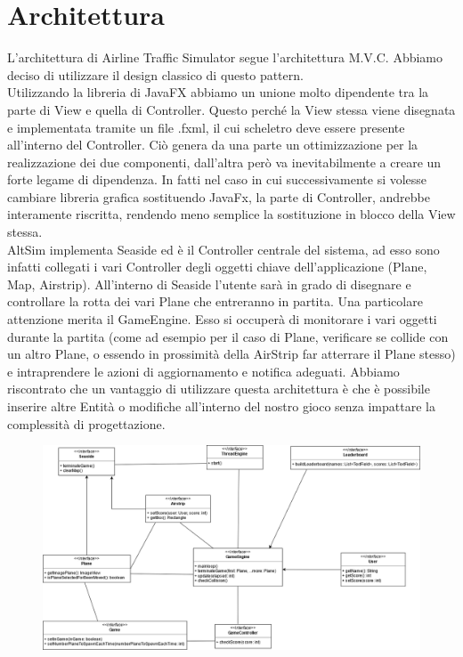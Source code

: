 \documentclass[a4paper,12pt]{report}
\begin{document}
\section{Architettura}
L’architettura di Airline Traffic Simulator segue l’architettura M.V.C. \newline
Abbiamo deciso di utilizzare il design classico di questo pattern.
\\
Utilizzando la libreria di JavaFX abbiamo un unione molto dipendente tra la parte di View e quella di Controller.
Questo perché la View stessa viene disegnata e implementata tramite un file .fxml, il cui scheletro deve essere presente all’interno del Controller.
Ciò genera da una parte un ottimizzazione per la realizzazione dei due componenti, dall’altra però va inevitabilmente a creare un forte legame di dipendenza.
In fatti nel caso in cui successivamente si volesse cambiare libreria grafica sostituendo JavaFx, la parte di Controller, andrebbe interamente riscritta, rendendo meno semplice la sostituzione in blocco della View stessa.
\\
AltSim implementa Seaside ed è il Controller centrale del sistema, ad esso sono infatti collegati i vari Controller degli oggetti chiave dell’applicazione (Plane, Map, Airstrip).
All’interno di Seaside l’utente sarà in grado di disegnare e controllare la rotta dei vari Plane che entreranno in partita.
Una particolare attenzione merita il GameEngine.
Esso si occuperà di monitorare i vari oggetti durante la partita (come ad esempio per il caso di Plane, verificare se collide con un altro Plane, o essendo in prossimità della AirStrip far atterrare il Plane stesso) e intraprendere le azioni di aggiornamento e notifica adeguati. Abbiamo riscontrato che un vantaggio di utilizzare questa architettura è che è possibile inserire altre Entità o modifiche all’interno del nostro gioco senza impattare la complessità di progettazione.
\begin{figure}[H]
    \begin{center}
        \centering
        \includegraphics[width=\textwidth]{img/Design/Architettura.png}
    \end{center}
    \label{img:architettura}
\end{figure}
\end{document}
